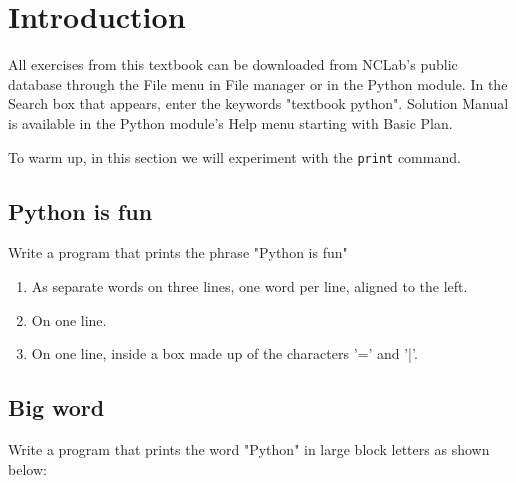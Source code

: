 

\section{Introduction}

All exercises from this textbook can be downloaded from NCLab's public database 
through the File menu in File manager or in the Python module. In the Search box 
that appears, enter the keywords "textbook python". Solution Manual is available 
in the Python module's Help menu starting with Basic Plan. 

To warm up, in this section we will experiment with the {\tt print} 
command.


\subsection{Python is fun}

Write a program that prints the phrase "Python is fun" 
\begin{enumerate}
\item As separate words on three lines, one word per line, aligned to the left.
\item On one line.
\item On one line, inside a box made up of the characters '=' and '|'.
\end{enumerate}


\subsection{Big word}

Write a program that prints the word "Python" in large block 
letters as shown below:

